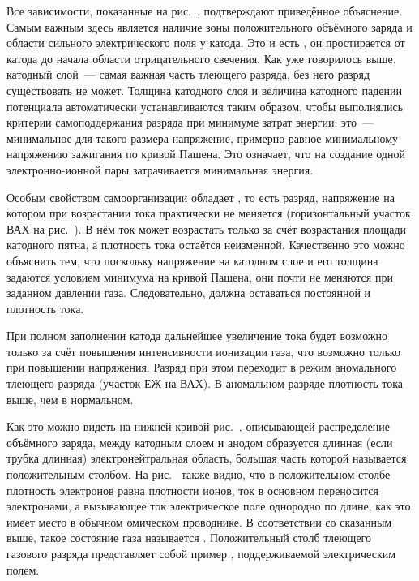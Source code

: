 Все зависимости, показанные на рис.~, подтверждают
приведённое объяснение. Самым важным здесь является наличие зоны
положительного объёмного заряда и области сильного электрического поля у катода.
Это и есть , он
простирается от катода до начала области отрицательного свечения. Как уже
говорилось выше, катодный слой~--- самая
важная часть тлеющего разряда, без него разряд существовать не может. Толщина
катодного слоя и величина катодного падении
потенциала автоматически устанавливаются таким образом, чтобы выполнялись
критерии самоподдержания разряда при минимуме
затрат энергии: это~--- минимальное для такого размера напряжение, примерно
равное минимальному напряжению зажигания по
кривой Пашена. Это означает, что на создание одной электронно-ионной пары
затрачивается минимальная энергия.

Особым свойством самоорганизации обладает ,
то есть разряд, напряжение на котором при
возрастании тока практически не меняется (горизонтальный участок ВАХ на
рис.~). В нём ток может возрастать только
за счёт возрастания площади катодного пятна, а плотность тока остаётся
неизменной. Качественно это можно объяснить тем,
что поскольку напряжение на катодном слое и его толщина задаются условием
минимума на кривой Пашена, они почти не
меняются при заданном давлении газа. Следовательно, должна оставаться постоянной
и плотность тока.

При полном заполнении катода дальнейшее увеличение тока будет возможно только за
счёт повышения интенсивности ионизации
газа, что возможно только при повышении напряжения. Разряд при этом переходит в
режим аномального тлеющего разряда
(участок ЕЖ на ВАХ). В аномальном разряде плотность тока выше, чем в нормальном.

Как это можно видеть на нижней кривой рис.~, описывающей
распределение объёмного заряда, между катодным слоем и анодом
образуется длинная (если трубка длинная) электронейтральная область, большая
часть которой называется положительным
столбом. На рис.~ также видно, что в положительном столбе
плотность электронов равна плотности ионов, ток в основном
переносится электронами, а вызывающее ток электрическое поле однородно по длине,
как это имеет место в обычном омическом
проводнике. В соответствии со сказанным выше, такое состояние газа называется
. Положительный столб
тлеющего газового разряда представляет собой пример
,
поддерживаемой электрическим полем.


